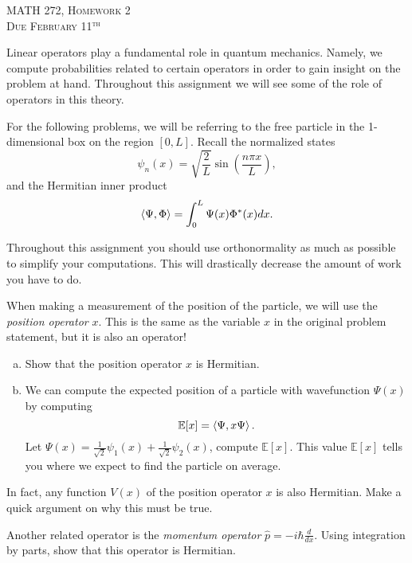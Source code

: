\documentclass[12pt]{article} %
\begin{document}
\begin{center}
   \textsc{\large MATH 272, Homework 2}\\
   \textsc{Due February 11$^\textrm{th}$}
\end{center}
\vspace{.5cm}

Linear operators play a fundamental role in quantum mechanics. Namely, we compute probabilities related to certain operators in order to gain insight on the problem at hand.  Throughout this assignment we will see some of the role of operators in this theory.  

For the following problems, we will be referring to the free particle in the 1-dimensional box on the region $[0,L]$. Recall the normalized states
   \[
   \psi_n(x) = \sqrt{\frac{2}{L}} \sin\left(\frac{n\pi x}{L}\right),
   \]
   and the Hermitian inner product
   \[
   \left\langle \Psi, \Phi \right\rangle = \int_0^L \Psi(x)\Phi^*(x)dx.
   \]
   
   Throughout this assignment you should use orthonormality as much as possible to simplify your computations. This will drastically decrease the amount of work you have to do.

\begin{problem}
  When making a measurement of the position of the particle, we will use the \emph{position operator} $x$.  This is the same as the variable $x$ in the original problem statement, but it is also an operator!
   \begin{enumerate}[(a)]
   		\item Show that the position operator $x$ is Hermitian.
   		\item We can compute the expected position of a particle with wavefunction $\Psi(x)$ by computing
   		\[
   		\mathbb{E}[x]=\left\langle \Psi, x\Psi \right\rangle.
   		\]
   		Let $\Psi(x) = \frac{1}{\sqrt{2}} \psi_1(x) + \frac{1}{\sqrt{2}} \psi_2(x)$, compute $\mathbb{E}[x]$. This value $\mathbb{E}[x]$ tells you where we expect to find the particle on average.
   	\end{enumerate}
\end{problem}

\begin{problem}
	In fact, any function $V(x)$ of the position operator $x$ is also Hermitian. Make a quick argument on why this must be true.
\end{problem}

\begin{problem}
	Another related operator is the \emph{momentum operator} $\hat{p} = -i\hbar \frac{d}{dx}$. Using integration by parts, show that this operator is Hermitian.
\end{problem}
\end{document}
